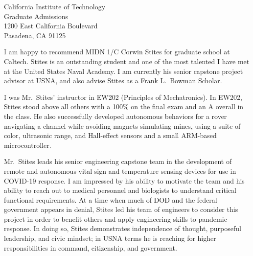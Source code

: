 \documentclass[10pt]{wrceletter}
\date{\today}
\begin{document}
\begin{letter}{%
California Institute of Technology\\
Graduate Admissions\\
1200 East California Boulevard\\
Pasadena, CA 91125}

\opening{}
\raggedright %
\setlength{\parindent}{15pt} %
I am happy to recommend MIDN 1/C Corwin Stites for graduate school at Caltech.  Stites is an outstanding student and one of the most talented I have met at the United States Naval Academy. I am currently his senior capstone project advisor at USNA, and also advise Stites as a Frank L.~Bowman Scholar. 

I was Mr.~Stites' instructor in EW202 (Principles of Mechatronics).  In EW202, Stites stood above all others with a 100\% on the final exam and an A overall in the class. He also successfully developed autonomous behaviors for a rover navigating a channel while avoiding magnets simulating mines, using a suite of color, ultrasonic range, and Hall-effect sensors and a small ARM-based microcontroller. 

Mr.~Stites leads his senior engineering capstone team in the development of remote and autonomous vital sign and temperature sensing devices for use in COVID-19 response. I am impressed by his ability to motivate the team and his ability to reach out to medical personnel and biologists to understand critical functional requirements. At a time when much of DOD and the federal government appears in denial, Stites led his team of engineers to consider this project in order to benefit others and apply engineering skills to pandemic response. In doing so, Stites demonstrates independence of thought, purposeful leadership, and civic mindset; in USNA terms he is reaching for higher responsibilities in command, citizenship, and government.


\end{letter}
\end{document}

